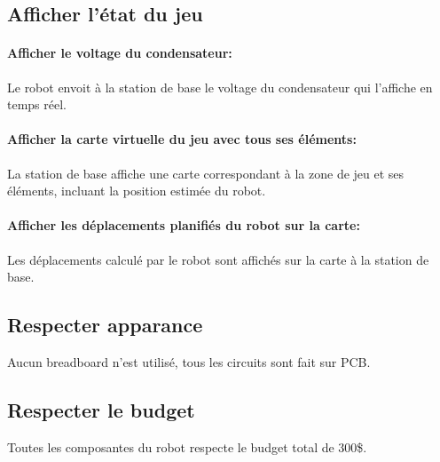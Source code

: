 \subsection{Afficher l'état du jeu}

\paragraph{Afficher le voltage du condensateur:}

Le robot envoit à la station de base le voltage du condensateur qui l'affiche en temps réel.

\paragraph{Afficher la carte virtuelle du jeu avec tous ses éléments:}

La station de base affiche une carte correspondant à la zone de jeu et ses éléments, incluant la position estimée du robot.

\paragraph{Afficher les déplacements planifiés du robot sur la carte:}

Les déplacements calculé par le robot sont affichés sur la carte à la station de base.

\subsection{Respecter apparance}

Aucun breadboard n'est utilisé, tous les circuits sont fait sur PCB.

\subsection{Respecter le budget}

Toutes les composantes du robot respecte le budget total de 300\$.
